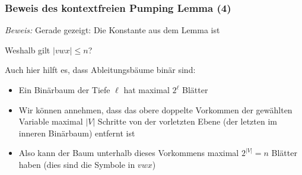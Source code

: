 \documentclass[onlymath]{beamer}
\begin{document}
\begin{frame}[t]\frametitle{Beweis des kontextfreien Pumping Lemma (4)}

\vspace{-1ex}
\medskip

\emph{Beweis:} %
% 
Gerade gezeigt: Die Konstante aus dem Lemma ist 
\medskip

\alert{Weshalb gilt $|vwx|\leq n$?}\pause\medskip

Auch hier hilft es, dass Ableitungsbäume binär sind:
\begin{itemize}
\item Ein Binärbaum der Tiefe $\ell$ hat maximal $2^\ell$ Blätter\pause
\item Wir können annehmen, dass das obere doppelte Vorkommen der gewählten Variable maximal
$|V|$ Schritte von der vorletzten Ebene (der letzten im inneren Binärbaum) entfernt ist\pause
\item Also kann der Baum unterhalb dieses Vorkommens maximal $2^{|V|}=n$ Blätter haben (dies sind die Symbole in $vwx$)
\end{itemize}

\end{frame}
\end{document}
